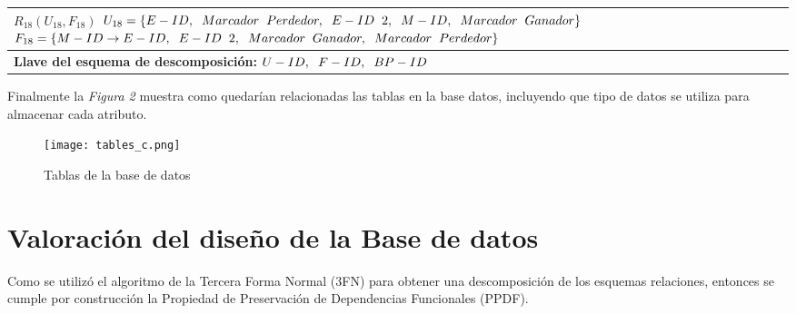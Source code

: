 \documentclass{report}
\begin{document}
\begin{tabularx}{\textwidth}{|X|}
        $ R_{18} ( U_{18} , F_{18} ) $ \newline 
        $ U_{18} = \{{E-ID, \hspace{0.2cm}  Marcador \hspace{0.2cm} Perdedor, \hspace{0.2cm}  E-ID \hspace{0.2cm} 2, \hspace{0.2cm}  M-ID, \hspace{0.2cm}  Marcador \hspace{0.2cm} Ganador}\} $ \newline 
        $ F_{18} = \{M-ID \rightarrow E-ID, \hspace{0.2cm} E-ID \hspace{0.2cm} 2, \hspace{0.2cm} Marcador \hspace{0.2cm} Ganador, \hspace{0.2cm} Marcador \hspace{0.2cm} Perdedor \} $\newline \\
        
        \midrule
        \textbf{Llave del esquema de descomposición:} $U-ID, \hspace{0.2cm} F-ID, \hspace{0.2cm} BP-ID$  \\
        \bottomrule
    \end{tabularx}

    \vspace*{0.5cm}

    Finalmente la \textit{Figura 2} muestra como quedarían relacionadas las tablas en la base datos, incluyendo que 
    tipo de datos se utiliza para almacenar cada atributo.\\

    \begin{figure}[htb]
        \centering
        \texttt{[image: tables\_c.png]}
        \caption{Tablas de la base de datos}
    \end{figure}


    \section*{Valoración del diseño de la Base de datos}
    Como se utilizó el algoritmo de la Tercera Forma Normal (3FN) para obtener una descomposición de los esquemas 
    relaciones, entonces se cumple por construcción la Propiedad de Preservación de Dependencias Funcionales (PPDF). \\
\end{document}
